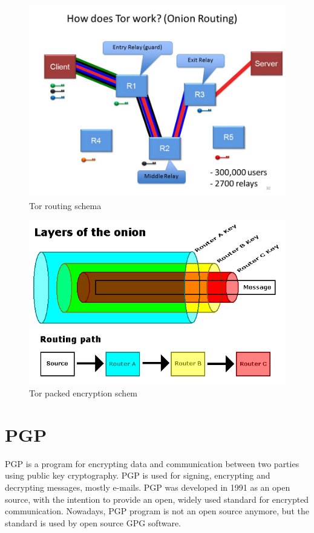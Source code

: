\documentclass[
  digital, %
  table,   %
  lof,     %
  lot,     %
  oneside
]{fithesis3}
\begin{document}
 \begin{figure}[!htb]
    \centering
    \includegraphics[width=1\textwidth]{tor-prejate}
    \caption{Tor routing schema}
    \label{Tor routing schema}
\end{figure}
 
  \begin{figure}[!htb]
    \centering
    \includegraphics[width=1\textwidth]{tor-packet-prejate}
    \caption{Tor packed encryption schem}
    \label{Tor packed encryption schema}
\end{figure}
 
\section{PGP}

PGP \parencite{Zimmermann:1995:OPU:202735} is a program for encrypting data
and communication between two parties using public key cryptography.
PGP is used for signing, encrypting and decrypting messages, mostly e-mails.
PGP was developed in 1991 as an open source, with the intention 
to provide an open, widely used standard for encrypted communication.
Nowadays, PGP program is not an open source anymore, but the standard is used by open source GPG software.
\end{document}

